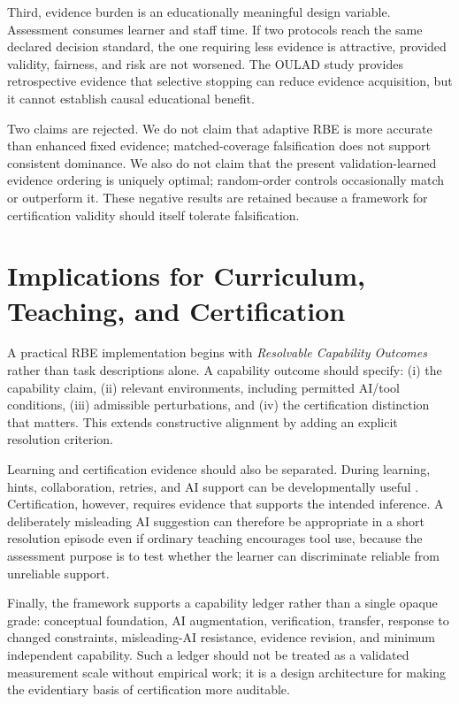\documentclass[11pt]{article}
\begin{document}
Third, evidence burden is an educationally meaningful design variable. Assessment consumes learner and staff time. If two protocols reach the same declared decision standard, the one requiring less evidence is attractive, provided validity, fairness, and risk are not worsened. The OULAD study provides retrospective evidence that selective stopping can reduce evidence acquisition, but it cannot establish causal educational benefit.

Two claims are rejected. We do not claim that adaptive RBE is more accurate than enhanced fixed evidence; matched-coverage falsification does not support consistent dominance. We also do not claim that the present validation-learned evidence ordering is uniquely optimal; random-order controls occasionally match or outperform it. These negative results are retained because a framework for certification validity should itself tolerate falsification.

\section{Implications for Curriculum, Teaching, and Certification}
A practical RBE implementation begins with \emph{Resolvable Capability Outcomes} rather than task descriptions alone. A capability outcome should specify: (i) the capability claim, (ii) relevant environments, including permitted AI/tool conditions, (iii) admissible perturbations, and (iv) the certification distinction that matters. This extends constructive alignment \parencite{biggs1996alignment} by adding an explicit resolution criterion.

Learning and certification evidence should also be separated. During learning, hints, collaboration, retries, and AI support can be developmentally useful \parencite{black1998assessment,nicol2006feedback,hattie2007feedback}. Certification, however, requires evidence that supports the intended inference. A deliberately misleading AI suggestion can therefore be appropriate in a short resolution episode even if ordinary teaching encourages tool use, because the assessment purpose is to test whether the learner can discriminate reliable from unreliable support.

Finally, the framework supports a capability ledger rather than a single opaque grade: conceptual foundation, AI augmentation, verification, transfer, response to changed constraints, misleading-AI resistance, evidence revision, and minimum independent capability. Such a ledger should not be treated as a validated measurement scale without empirical work; it is a design architecture for making the evidentiary basis of certification more auditable.
\end{document}
